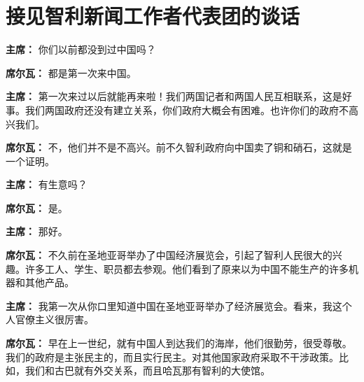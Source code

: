 \section[接见智利新闻工作者代表团的谈话（一九六四年六月二十三日）]{接见智利新闻工作者代表团的谈话}

\begin{list}{}{
    \setlength{\topsep}{0pt}        %
    \setlength{\partopsep}{0pt}     %
    \setlength{\parsep}{\parskip}   %
    \setlength{\itemsep}{\lineskip}       %
    \setlength{\labelsep}{0pt}%
    \setlength{\labelwidth}{3em}%
    \setlength{\itemindent}{0pt}%
    \setlength\listparindent{\parindent}
    \setlength{\leftmargin}{3em}
    \setlength{\rightmargin}{0pt}
    }

\item[\textbf{主席：}] 你们以前都没到过中国吗？

\item[\textbf{席尔瓦：}] 都是第一次来中国。

\item[\textbf{主席：}] 第一次来过以后就能再来啦！我们两国记者和两国人民互相联系，这是好事。我们两国政府还没有建立关系，你们政府大概会有困难。也许你们的政府不高兴我们。

\item[\textbf{席尔瓦：}] 不，他们并不是不高兴。前不久智利政府向中国卖了铜和硝石，这就是一个证明。

\item[\textbf{主席：}] 有生意吗？

\item[\textbf{席尔瓦：}] 是。

\item[\textbf{主席：}] 那好。

\item[\textbf{席尔瓦：}] 不久前在圣地亚哥举办了中国经济展览会，引起了智利人民很大的兴趣。许多工人、学生、职员都去参观。他们看到了原来以为中国不能生产的许多机器和其他产品。

\item[\textbf{主席：}] 我第一次从你口里知道中国在圣地亚哥举办了经济展览会。看来，我这个人官僚主义很厉害。

\item[\textbf{席尔瓦：}] 早在上一世纪，就有中国人到达我们的海岸，他们很勤劳，很受尊敬。我们的政府是主张民主的，而且实行民主。对其他国家政府采取不干涉政策。比如，我们和古巴就有外交关系，而且哈瓦那有智利的大使馆。


\end{list}
